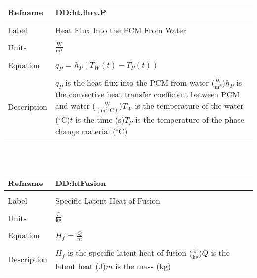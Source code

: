 \documentclass[12pt]{article}
\begin{document}
\noindent \begin{minipage}{\textwidth}
\begin{tabular}{p{} p{}}
\toprule \textbf{Refname} & \textbf{DD:ht.flux.P}
\label{DD:ht.flux.P}
\\ \midrule \\
Label & Heat Flux Into the PCM From Water
\\ \midrule \\
Units & $\frac{\text{W}}{\text{m}^{2}}$
\\ \midrule \\
Equation & ${q_{P}}$ = ${h_{P}} \left({T_{W}}\left(t\right)-{T_{P}}\left(t\right)\right)$
\\ \midrule \\
Description & ${q_{P}}$ is the heat flux into the PCM from water ($\frac{\text{W}}{\text{m}^{2}}$)\newline${h_{P}}$ is the convective heat transfer coefficient between PCM and water ($\frac{\text{W}}{(\text{m}^{2}{}^{\circ}\text{C})}$)\newline${T_{W}}$ is the temperature of the water (${}^{\circ}$C)\newline$t$ is the time (s)\newline${T_{P}}$ is the temperature of the phase change material (${}^{\circ}$C)
\\ \bottomrule \end{tabular}
\end{minipage}\\
~\newline
\noindent \begin{minipage}{\textwidth}
\begin{tabular}{p{} p{}}
\toprule \textbf{Refname} & \textbf{DD:htFusion}
\label{DD:htFusion}
\\ \midrule \\
Label & Specific Latent Heat of Fusion
\\ \midrule \\
Units & $\frac{\text{J}}{\text{kg}}$
\\ \midrule \\
Equation & ${H_{f}}$ = $\frac{Q}{m}$
\\ \midrule \\
Description & ${H_{f}}$ is the specific latent heat of fusion ($\frac{\text{J}}{\text{kg}}$)\newline$Q$ is the latent heat (J)\newline$m$ is the mass (kg)
\\ \bottomrule \end{tabular}
\end{minipage}\\
\end{document}

